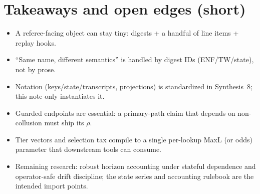 \documentclass[11pt]{article}
\begin{document}
\section{Takeaways and open edges (short)}
\begin{itemize}[leftmargin=*]
\item A referee-facing object can stay tiny: digests + a handful of line items + replay hooks.
\item ``Same name, different semantics'' is handled by digest IDs (ENF/TW/state), not by prose.
\item Notation (keys/state/transcripts, projections) is standardized in Synthesis~8; this note only instantiates it.\cite{series:notation}
\item Guarded endpoints are essential: a primary-path claim that depends on non-collusion must ship its $\rho$.
\item Tier vectors and selection tax compile to a single per-lookup MaxL (or odds) parameter that downstream tools can consume.\cite{series:endpointbridge}
\item Remaining research: robust horizon accounting under stateful dependence and operator-safe drift discipline; the state series and accounting rulebook are the intended import points.\cite{series:state1,series:accountingrulebook}
\end{itemize}
\end{document}
